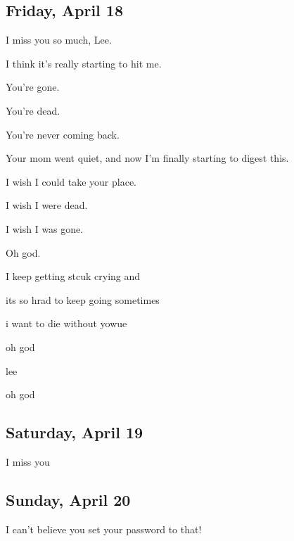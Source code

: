 {\newpage

\subsection*{Friday, April 18}\label{friday-april-18}

 I miss you so much, Lee.

 I think it's really starting to hit me.

 You're gone.

 You're dead.

 You're never coming back.

 Your mom went quiet, and now I'm finally starting to digest this.

 I wish I could take your place.

 I wish I were dead.

 I wish I was gone.

 Oh god.

 I keep getting stcuk crying and

 its so hrad to keep going sometimes

 i want to die without yowue

 oh god

 lee

 oh god

\newpage

\subsection*{Saturday, April 19}\label{saturday-april-19}

 I miss you

\newpage

\subsection*{Sunday, April 20}\label{sunday-april-20}

 I can't believe you set your password to that!

}
